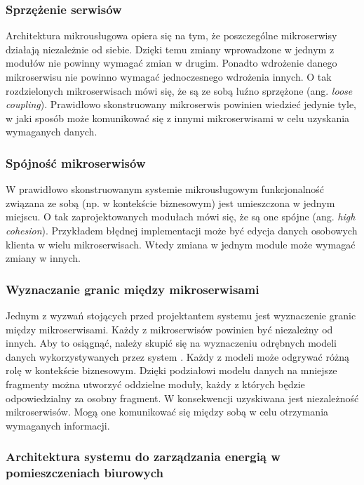 \subsubsection{Sprzężenie serwisów}

Architektura mikrousługowa opiera się na tym, że poszczególne mikroserwisy działają 
niezależnie od siebie. Dzięki temu zmiany wprowadzone w jednym z modułów nie powinny 
wymagać zmian w drugim. Ponadto wdrożenie danego mikroserwisu nie powinno wymagać 
jednoczesnego wdrożenia innych. O tak rozdzielonych mikroserwisach mówi się, że są ze sobą 
luźno sprzężone (ang. \textit{loose coupling}). Prawidłowo skonstruowany mikroserwis powinien 
wiedzieć jedynie tyle, w jaki sposób może komunikować się z innymi mikroserwisami w celu 
uzyskania wymaganych danych.

\subsubsection{Spójność mikroserwisów}
W prawidłowo skonstruowanym systemie mikrousługowym funkcjonalność związana ze 
sobą (np. w kontekście biznesowym) jest umieszczona w jednym miejscu. O tak 
zaprojektowanych modułach mówi się, że są one spójne (ang. \textit{high cohesion}). 
Przykładem 
błędnej implementacji może być edycja danych osobowych klienta w wielu mikroserwisach. 
Wtedy zmiana w jednym module może wymagać zmiany w innych.

\subsubsection{Wyznaczanie granic między mikroserwisami}

Jednym z wyzwań stojących przed projektantem systemu jest wyznaczenie granic między
mikroserwisami. Każdy z mikroserwisów powinien być niezależny od innych. Aby to osiągnąć, należy
skupić się na wyznaczeniu odrębnych modeli danych wykorzystywanych przez system
\cite{delatorre2015}.
Każdy z modeli może odgrywać różną rolę w kontekście biznesowym. Dzięki podziałowi
modelu danych na mniejsze fragmenty można utworzyć oddzielne moduły, każdy z których
będzie odpowiedzialny za osobny fragment. W konsekwencji uzyskiwana jest niezależność
mikroserwisów. Mogą one komunikować się między sobą w celu otrzymania wymaganych informacji.

\subsubsection{Architektura systemu do zarządzania energią w pomieszczeniach biurowych}

